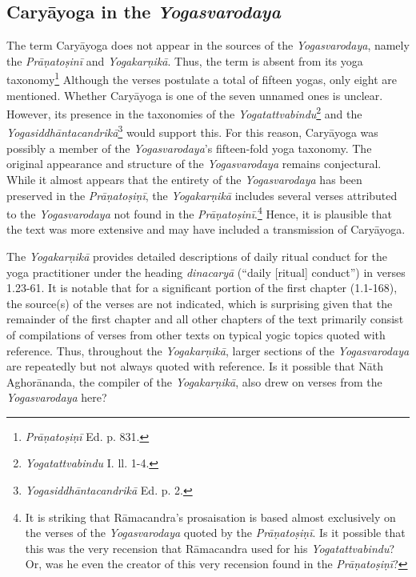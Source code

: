 \subsection{Caryāyoga in the \textit{Yogasvarodaya}}
\label{caryasvaro}
The term Caryāyoga does not appear in the sources of the \textit{Yogasvarodaya}, namely the \textit{Prāṇatoṣinī} and \textit{Yogakarṇikā}. Thus, the term is absent from its yoga taxonomy\footnote{\textit{Prāṇatoṣiṇī} Ed. p. 831.} Although the verses postulate a total of fifteen yogas, only eight are mentioned. Whether Caryāyoga is one of the seven unnamed ones is unclear. However, its presence in the taxonomies of the \textit{Yogatattvabindu}\footnote{\textit{Yogatattvabindu} I. ll. 1-4.} and the \textit{Yogasiddhāntacandrikā}\footnote{\textit{Yogasiddhāntacandrikā} Ed. p. 2.} would support this. For this reason, Caryāyoga was possibly a member of the \textit{Yogasvarodaya}'s fifteen-fold yoga taxonomy. The original appearance and structure of the \textit{Yogasvarodaya} remains conjectural. While it almost appears that the entirety of the \textit{Yogasvarodaya} has been preserved in the \textit{Prāṇatoṣiṇī}, the \textit{Yogakarṇikā} includes several verses attributed to the \textit{Yogasvarodaya} not found in the \textit{Prāṇatoṣinī}.\footnote{It is striking that Rāmacandra's prosaisation is based almost exclusively on the verses of the \textit{Yogasvarodaya} quoted by the \textit{Prāṇatoṣiṇī}. Is it possible that this was the very recension that Rāmacandra used for his \emph{Yogatattvabindu}? Or, was he even the creator of this very recension found in the \textit{Prāṇatoṣiṇī}?} Hence, it is plausible that the text was more extensive and may have included a transmission of Caryāyoga.

The \textit{Yogakarṇikā} provides detailed descriptions of daily ritual conduct for the yoga practitioner under the heading \textit{dinacaryā} (``daily [ritual] conduct'') in verses 1.23-61. It is notable that for a significant portion of the first chapter (1.1-168), the source(s) of the verses are not indicated, which is surprising given that the remainder of the first chapter and all other chapters of the text primarily consist of compilations of verses from other texts on typical yogic topics quoted with reference. Thus, throughout the \textit{Yogakarṇikā}, larger sections of the \textit{Yogasvarodaya} are repeatedly but not always quoted with reference. Is it possible that Nāth Aghorānanda, the compiler of the \textit{Yogakarṇikā}, also drew on verses from the \textit{Yogasvarodaya} here?

